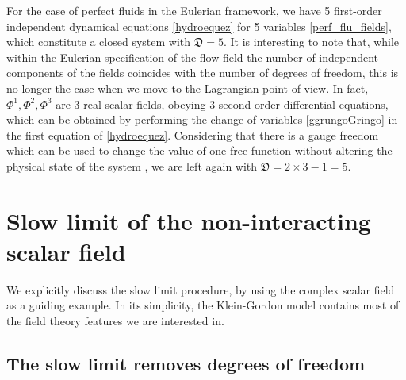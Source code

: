 \documentclass[a4paper, amsfonts, amssymb, amsmath, reprint, twocolumn, showkeys, nofootinbib]{revtex4-2}
\begin{document}
For the case of perfect fluids in the Eulerian framework, we have 5 first-order independent dynamical equations \eqref{hydroequez} for 5 variables \eqref{perf_flu_fields}, which constitute a closed system with $\mathfrak{D}=5$. It is interesting to note that, while within the Eulerian specification of the flow field the number of independent components of the fields coincides with the number of degrees of freedom, this is no longer the case when we move to the Lagrangian point of view. In fact, $\Phi^1,\Phi^2,\Phi^3$ are 3 real scalar fields, obeying 3 second-order differential equations, which can be obtained by  performing the change of variables \eqref{ggrungoGringo} in the first equation of \eqref{hydroequez}. 
Considering that there is a gauge freedom which can be used to change the value of one free function without altering the physical state of the system \citep{Comer_1993}, we are left again with $\mathfrak{D}=2\times 3-1=5$. 


\section{Slow limit of the non-interacting scalar field}

We explicitly discuss the slow limit procedure, by using the complex scalar field as a guiding example. In its simplicity, the Klein-Gordon model contains most of the field theory features we are interested in. 

\subsection{The slow limit removes degrees of freedom}
\end{document}
